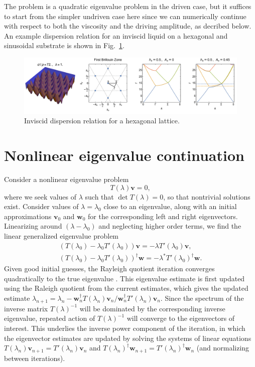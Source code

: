 \documentclass[aps,pre,amsmath,amssymb,floatfix,onecolumn,notitlepage,10pt]{revtex4-1}
\begin{document}
The problem is a quadratic eigenvalue problem in the driven case, but it suffices to start from the simpler undriven case here since we can numerically continue with respect to both the viscosity and the driving amplitude, as decribed below. An example dispersion relation for an inviscid liquid on a hexagonal and sinusoidal substrate is shown in Fig.~\ref{fig2}.
\begin{figure}[hbt]
\includegraphics[width=\columnwidth]{hexagonal}
\caption{Inviscid dispersion relation for a hexagonal lattice. \label{fig2}}
\end{figure}

\section{Nonlinear eigenvalue continuation}
Consider a nonlinear eigenvalue problem
\begin{equation}
T(\lambda) \mathbf{v} = 0,
\end{equation}
where we seek values of $\lambda$ such that $\det T(\lambda)=0$, so that nontrivial solutions exist. Consider values of $\lambda=\lambda_0$ close to an eigenvalue, along with an initial approximations $\mathbf{v}_0$ and $\mathbf{w}_0$ for the corresponding left and right eigenvectors. Linearizing around $(\lambda-\lambda_0)$ and neglecting higher order terms, we find the linear generalized eigenvalue problem
\begin{align}
(T(\lambda_0)-\lambda_0 T'(\lambda_0))\mathbf{v} = -\lambda T'(\lambda_0) \mathbf{v}, \\
(T(\lambda_0)-\lambda_0 T'(\lambda_0))^\dagger \mathbf{w} = -\lambda^* T'(\lambda_0)^\dagger \mathbf{w}.
\end{align}
Given good initial guesses, the Rayleigh quotient iteration converges quadratically to the true eigenvalue \cite{1973_Ruhe}. This eigenvalue estimate is first updated using the Raleigh quotient from the current estimates, which gives  the updated estimate $\lambda_{n+1} = \lambda_n - \mathbf{w}_n^\dagger T(\lambda_n) \mathbf{v}_n /  \mathbf{w}_n^\dagger T'(\lambda_n) \mathbf{v}_n$. Since the spectrum of the inverse matrix $T(\lambda)^{-1}$ will be dominated by the corresponding inverse eigenvalue, repeated action of $T(\lambda)^{-1}$ will converge to the eigenvectors of interest. This underlies the inverse power component of the iteration, in which the eigenvector estimates are updated by solving the systems of linear equations $T(\lambda_n) \mathbf{v}_{n+1} = T'(\lambda_n)\mathbf{v}_n$ and $T(\lambda_n)^\dagger \mathbf{w}_{n+1} = T'(\lambda_n)^\dagger \mathbf{w}_n$ (and normalizing between iterations).
\end{document}
